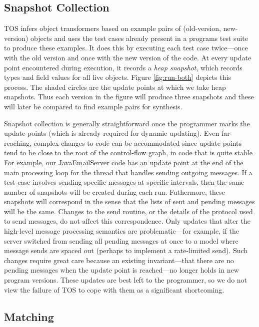 \documentclass[natbib,10pt]{sigplanconf}
\newcommand{\TOS}{TOS\xspace}
\begin{document}
\subsection{Snapshot Collection}

\TOS infers object transformers based on example pairs of (old-version,
new-version) objects and uses the test cases already present in
a programs test suite to produce these examples.
It does this by executing each test case twice---once with the old version
and once with the new version of the code.  At every update point
encountered during execution, it records 
a \textit{heap snapshot}, which records types and field values for all live
objects.
Figure \ref{fig:run-both} depicts this process.
The shaded circles are the update points at which we take heap
snapshots.  Thus each version in the figure will produce three
snapshots and these will later be compared to find example pairs for synthesis.

Snapshot collection is generally straightforward once the programmer
marks the update
points (which is already required
for dynamic updating).  Even far-reaching, complex
changes to code can be accommodated since update points tend to be
close to the root of the control-flow graph, in code that is quite stable.  For
example, our JavaEmailServer code has an update point at the end of
the main processing loop for the thread that handles sending outgoing
messages.  If a test case involves sending specific messages at
specific intervals, then the same number of snapshots will be created
during each run.  Futhermore, these snapshots will correspond in the sense that
the lists of sent and pending messages will be the same.  Changes to
the send routine, or the details of
the protocol used to send messages, do not affect this
correspondence.  Only updates that alter the high-level message
processing semantics are problematic---for example,
if the server switched from sending all pending messages at once to a
model where message sends are spaced out (perhaps to implement a
rate-limited send).  Such changes require great care because an
existing invariant---that there are no pending messages when the
update point is reached---no longer holds in new program versions.
These updates are best left to the programmer, so we do not view the
failure of TOS to cope with them as a significant shortcoming.

\subsection{Matching}
\label{sec:matching-overview}
\end{document}
